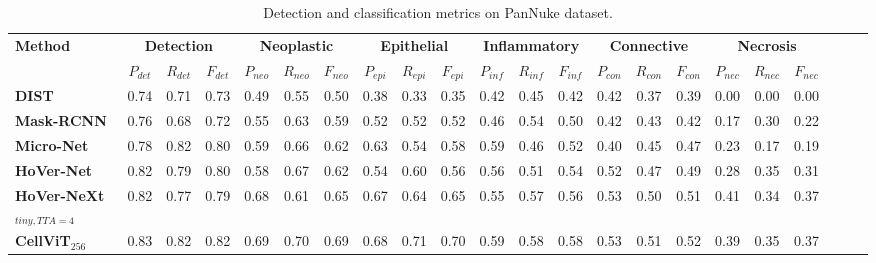 \begin{table}[ht]
\vskip -0.1in
\centering
\caption{Detection and classification metrics on PanNuke dataset.}
\label{tab:pannuke}
\vskip 0.1in
\begin{adjustbox}{width=\textwidth}
\begin{tabular}{l|ccc|ccc|ccc|ccc|ccc|cccccc}
\toprule
\multirow{2}{*}{\textbf{Method}} & \multicolumn{3}{c|}{\textbf{Detection}} & \multicolumn{3}{c|}{\textbf{Neoplastic}} & \multicolumn{3}{c|}{\textbf{Epithelial}} & \multicolumn{3}{c|}{\textbf{Inflammatory}} & \multicolumn{3}{c|}{\textbf{Connective}} & \multicolumn{3}{c}{\textbf{Necrosis}} \\
& $P_{det}$ & $R_{det}$ & $F_{det}$ & $P_{neo}$ & $R_{neo}$ & $F_{neo}$ & $P_{epi}$ & $R_{epi}$ & $F_{epi}$ & $P_{inf}$ & $R_{inf}$ & $F_{inf}$ & $P_{con}$ & $R_{con}$ & $F_{con}$ & $P_{nec}$ & $R_{nec}$ & $F_{nec}$ \\
\midrule
\textbf{DIST} \cite{naylor2018segmentation} & 0.74 & 0.71 &0.73 & 
       0.49 & 0.55 & 0.50 & 
       0.38 & 0.33 & 0.35 &
       0.42 & 0.45 & 0.42 &
       0.42 & 0.37 & 0.39 &
       0.00 & 0.00 & 0.00 \\
\textbf{Mask-RCNN} \cite{he2017mask} & 0.76 & 0.68 & 0.72 &
            0.55 & 0.63 & 0.59 &
            0.52 & 0.52 & 0.52 &
            0.46 & 0.54 & 0.50 &
            0.42 & 0.43 & 0.42 &
            0.17 & 0.30 & 0.22 \\
\textbf{Micro-Net} \cite{raza2019micro} & 0.78 & 0.82 & 0.80 &
            0.59 & 0.66 & 0.62 &
            0.63 & 0.54 & 0.58 &
            0.59 & 0.46 & 0.52 &
            0.40 & 0.45 & 0.47 &
            0.23 & 0.17 & 0.19 \\
\textbf{HoVer-Net} \cite{graham2019hover} & 0.82 & 0.79 & 0.80 &
            0.58 & 0.67 & 0.62 &
            0.54 & 0.60 & 0.56 &
            0.56 & 0.51 & 0.54 &
            0.52 & 0.47 & 0.49 &
            0.28 & 0.35 & 0.31 \\

\textbf{HoVer-NeXt}$_{tiny, TTA=4}$ \cite{baumann2024hover} & 0.82 & 0.77 & 0.79 &
        0.68 & 0.61 & 0.65 &
        0.67 & 0.64 & 0.65 &
        0.55 & 0.57 & 0.56 &
        0.53 & 0.50 & 0.51 &
        0.41 & 0.34 & 0.37 \\

\textbf{CellViT}$_{256}$ \cite{hörst2023cellvit} & 0.83 & 0.82 & 0.82 &
          0.69 & 0.70 & 0.69 &
          0.68 & 0.71 & 0.70 &
          0.59 & 0.58 & 0.58 &
          0.53 & 0.51 & 0.52 &
          0.39 & 0.35 & 0.37\\


\end{tabular}
\end{adjustbox}
\end{table}
